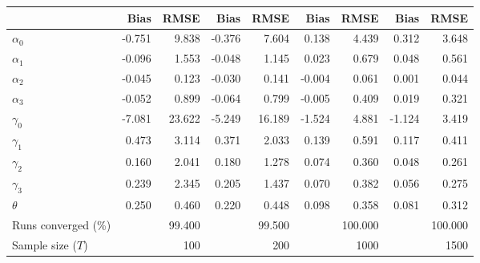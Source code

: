 
\begin{tabular}[t]{lrrrrrrrr}
\toprule
  & Bias & RMSE & Bias & RMSE & Bias & RMSE & Bias & RMSE\\
\midrule
$\alpha_{0}$ & -0.751 & 9.838 & -0.376 & 7.604 & 0.138 & 4.439 & 0.312 & 3.648\\
$\alpha_{1}$ & -0.096 & 1.553 & -0.048 & 1.145 & 0.023 & 0.679 & 0.048 & 0.561\\
$\alpha_{2}$ & -0.045 & 0.123 & -0.030 & 0.141 & -0.004 & 0.061 & 0.001 & 0.044\\
$\alpha_{3}$ & -0.052 & 0.899 & -0.064 & 0.799 & -0.005 & 0.409 & 0.019 & 0.321\\
$\gamma_{0}$ & -7.081 & 23.622 & -5.249 & 16.189 & -1.524 & 4.881 & -1.124 & 3.419\\
$\gamma_{1}$ & 0.473 & 3.114 & 0.371 & 2.033 & 0.139 & 0.591 & 0.117 & 0.411\\
$\gamma_{2}$ & 0.160 & 2.041 & 0.180 & 1.278 & 0.074 & 0.360 & 0.048 & 0.261\\
$\gamma_{3}$ & 0.239 & 2.345 & 0.205 & 1.437 & 0.070 & 0.382 & 0.056 & 0.275\\
$\theta$ & 0.250 & 0.460 & 0.220 & 0.448 & 0.098 & 0.358 & 0.081 & 0.312\\
Runs converged (\%) &  & 99.400 &  & 99.500 &  & 100.000 &  & 100.000\\
Sample size ($T$) &  & 100 &  & 200 &  & 1000 &  & 1500\\
\bottomrule
\end{tabular}
